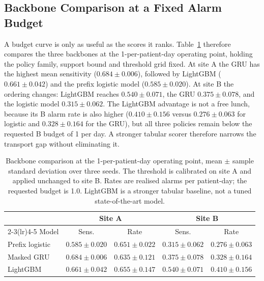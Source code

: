 \subsection{Backbone Comparison at a Fixed Alarm Budget}
\label{sec:models}

A budget curve is only as useful as the scores it ranks. Table~\ref{tab:model-comparison} therefore compares the three backbones at the 1-per-patient-day operating point, holding the policy family, support bound and threshold grid fixed. At site A the GRU has the highest mean sensitivity ($0.684\pm0.006$), followed by LightGBM ($0.661\pm0.042$) and the prefix logistic model ($0.585\pm0.020$). At site B the ordering changes: LightGBM reaches $0.540\pm0.071$, the GRU $0.375\pm0.078$, and the logistic model $0.315\pm0.062$. The LightGBM advantage is not a free lunch, because its B alarm rate is also higher ($0.410\pm0.156$ versus $0.276\pm0.063$ for logistic and $0.328\pm0.164$ for the GRU), but all three policies remain below the requested B budget of 1 per day. A stronger tabular scorer therefore narrows the transport gap without eliminating it.

\begin{table}[H]
\centering
\caption{Backbone comparison at the 1-per-patient-day operating point, mean $\pm$ sample standard deviation over three seeds. The threshold is calibrated on site A and applied unchanged to site B. Rates are realised alarms per patient-day; the requested budget is 1.0. LightGBM is a stronger tabular baseline, not a tuned state-of-the-art model.}
\label{tab:model-comparison}
\small
\begin{tabular}{lcccc}
\toprule
 & \multicolumn{2}{c}{Site A} & \multicolumn{2}{c}{Site B} \\
\cmidrule(lr){2-3}\cmidrule(lr){4-5}
Model & Sens. & Rate & Sens. & Rate \\
\midrule
Prefix logistic & $0.585\pm0.020$ & $0.651\pm0.022$ & $0.315\pm0.062$ & $0.276\pm0.063$ \\
Masked GRU & $0.684\pm0.006$ & $0.635\pm0.121$ & $0.375\pm0.078$ & $0.328\pm0.164$ \\
LightGBM & $0.661\pm0.042$ & $0.655\pm0.147$ & $0.540\pm0.071$ & $0.410\pm0.156$ \\
\bottomrule
\end{tabular}
\end{table}

